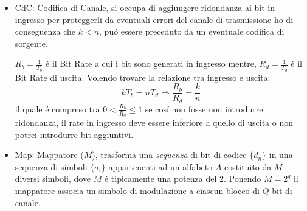     \begin{itemize}
        \item {CdC: Codifica di Canale, si occupa di aggiungere ridondanza ai bit in ingresso per proteggerli da eventuali errori del canale di trasmissione ho di
            conseguenza che $k<n$, puó essere preceduto da un eventuale codifica di sorgente. 
            \begin{figure}[H]
                \centering 
            \end{figure}
            $R_b = \frac{1}{T_b}$ é il Bit Rate a cui i bit sono generati in ingresso mentre, $R_d = \frac{1}{T_d}$ é il Bit Rate di uscita. Volendo trovare la relazione tra ingresso e uscita:
            \[
                kT_b = nT_d \Rightarrow \frac{R_b}{R_d} = \frac{k}{n}     
            \] 
            il quale é compreso tra $0<\frac{R_b}{R_d}\leq 1$ se cosí non fosse non introdurrei ridondanza, il rate in ingresso deve essere inferiore a quello di uscita o non 
            potrei introdurre bit aggiuntivi.
        }
        \item {Map: Mappatore ($M$), trasforma una \emph{sequenza} di bit di codice $\{d_n\}$ in una sequenza di simboli $\{a_i\}$ appartenenti ad un alfabeto $A$ costituito
            da $M$ diversi simboli, dove $M$ é tipicamente una potenza del $2$. Ponendo $M=2^q$ il mappatore associa un simbolo di modulazione a ciascun blocco di $Q$ bit di canale. 
            \begin{figure}[H]
                \centering 
                \begin{tikzpicture}[
                    node distance=3cm,
                    >=latex
                    ]
        

\end{tikzpicture}
\end{figure}}
\end{itemize}
